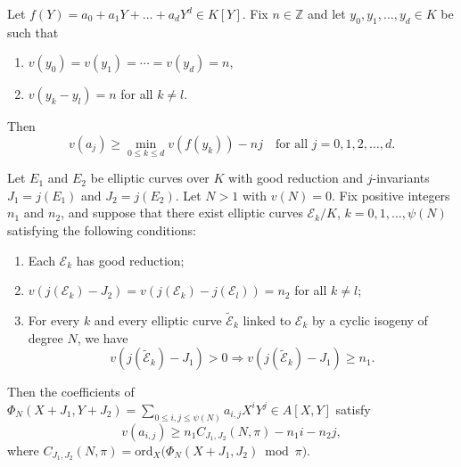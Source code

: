 \documentclass[10pt,a4paper]{amsart}
\def\BZ{\mathbb{Z}}
\def\CE{\mathcal{E}}
\newcommand{\ord}{\mathrm{ord}}
\begin{document}
\begin{lemma}\label{lem:interpolation}
    Let $f(Y) = a_0 + a_1Y + \ldots + a_dY^d \in K[Y]$.
    Fix $n\in\BZ$ and
    let $y_0, y_1,\ldots, y_d\in K$ be such that
    \begin{enumerate}
        \item $v(y_0)=v(y_1)=\cdots=v(y_d)=n$,
        \item $v(y_k-y_l) = n$ for all $k\neq l$.
    \end{enumerate}
    Then 
    \[
    v(a_j)  \geq \min_{0\leq k \leq d} v(f(y_k)) - nj
    \quad \text{for all $j=0,1,2,\ldots, d$}.
    \]
\end{lemma}

\begin{prop}\label{prop:general}
	Let $E_1$ and $E_2$ be elliptic curves over $K$ with good reduction and $j$-invariants $J_1 = j(E_1)$ and $J_2 = j(E_2)$.
    Let $N > 1$ with $v(N)=0$.
    Fix positive integers $n_1$ and $n_2$, and suppose that there exist elliptic curves $\CE_k/K$, $k=0,1,\ldots, \psi(N)$ satisfying the following conditions:
    \begin{enumerate}
        \item Each $\CE_k$ has good reduction;
        \item $v(j(\CE_k)-J_2) = v(j(\CE_k)-j(\CE_l)) = n_2$ for all $k\neq l$;
        \item For every $k$ and every elliptic curve $\tilde{\CE}_k$ linked to $\CE_k$ by a cyclic isogeny of degree $N$, we have
        \[
        v(j(\tilde{\CE}_k) - J_1) > 0 \Longrightarrow v(j(\tilde{\CE}_k) - J_1) \geq n_1.
        \]
    \end{enumerate}
    Then the coefficients of $\Phi_N(X+J_1, Y+J_2) = \sum_{0\leq i,j \leq \psi(N)}a_{i,j}X^iY^j\in A[X,Y]$ satisfy
    \[
    v(a_{i,j}) \geq n_1 C_{J_1,J_2}(N,\pi)-n_1 i-n_2 j,
    \]
    where $C_{J_1,J_2}(N,\pi) = \ord_X\big(\Phi_N(X+J_1,J_2) \bmod \pi\big).$
\end{prop}
\end{document}
